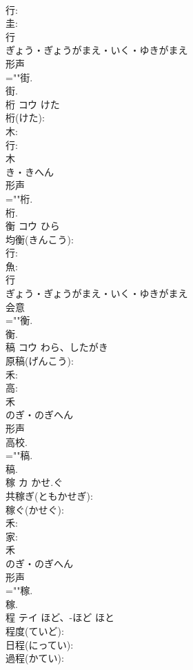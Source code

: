 \documentclass[8pt]{extreport}
\begin{document}
\begin{CJK}{UTF8}{min}
\\	行: 
\\	圭: 
\\	行	
\\	ぎょう・ぎょうがまえ・いく・ゆきがまえ	
\\	形声 
\\	=""街.
\\	街.
\\	桁	コウ	けた		
\\	桁(けた): 
\\	木: 
\\	行: 
\\	木	
\\	き・きへん	
\\	形声 
\\	=""桁.
\\	桁.
\\	衡	コウ		ひら	
\\	均衡(きんこう): 
\\	行: 
\\	魚: 
\\	行	
\\	ぎょう・ぎょうがまえ・いく・ゆきがまえ	
\\	会意 
\\	=""衡.
\\	衡.
\\	稿	コウ	わら、したがき		
\\	原稿(げんこう): 
\\	禾: 
\\	高: 
\\	禾	
\\	のぎ・のぎへん	
\\	形声 
\\	高校.
\\	=""稿.
\\	稿.
\\	稼	カ	かせ.ぐ		
\\	共稼ぎ(ともかせぎ): 
\\	稼ぐ(かせぐ): 
\\	禾: 
\\	家: 
\\	禾	
\\	のぎ・のぎへん	
\\	形声 
\\	=""稼.
\\	稼.
\\	程	テイ	ほど、-ほど	ほと	
\\	程度(ていど): 
\\	日程(にってい): 
\\	過程(かてい): 

\end{CJK}
\end{document}
